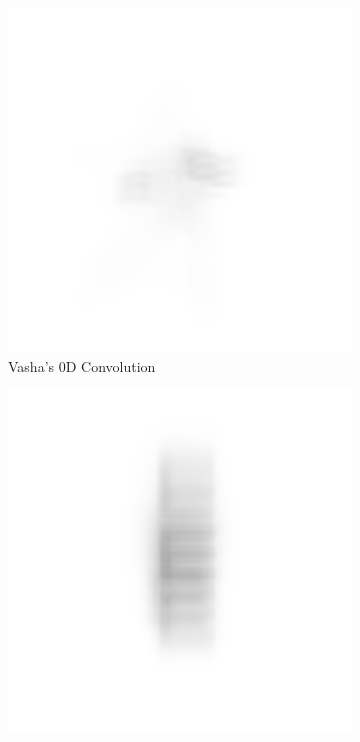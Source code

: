 \documentclass{article}
\begin{document}
\begin{figure}[H]
\begin{subfigure}{.3\textwidth}
  \centering
  \includegraphics[width=1\linewidth]{Vasha_R_G_0530_2_500_zer_0_5_PSF_convE.png}
  \caption{Vasha's 0D Convolution}
  \label{fig:vasha0d}
\end{subfigure}
\begin{subfigure}{.3\textwidth}
  \centering
  \includegraphics[width=1\linewidth]{Liz_R_G_0523_2_500_zer_0_5_PSF_convE.png}

\end{subfigure}
\end{figure}
\end{document}
